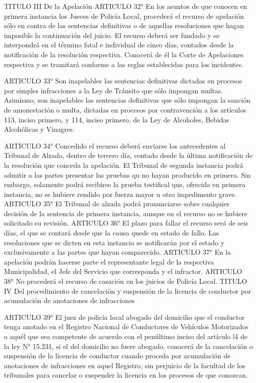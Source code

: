     TITULO III
    De la Apelación
    ARTICULO 32° En los asuntos de que conocen en primera instancia los Jueces de Policía Local, procederá el recurso de apelación sólo en contra de las sentencias definitivas o de aquellas resoluciones que hagan imposible la continuación del juicio. El recurso deberá ser fundado y se interpondrá en el término fatal e individual de cinco días, contados desde la notificación de la resolución respectiva.
    Conocerá de él la Corte de Apelaciones respectiva y se tramitará conforme a las reglas establecidas para los incidentes.
 



    ARTICULO 33° Son inapelables las sentencias definitivas dictadas en procesos por simples infracciones a la Ley de Tránsito que sólo impongan multas.
    Asimismo, son inapelables las sentencias definitivas que sólo impongan la sanción de amonestación o multa, dictadas en procesos por contravención a los artículos 113, inciso primero, y 114, inciso primero, de la Ley de Alcoholes, Bebidas Alcohólicas y Vinagres.

    ARTICULO 34° Concedido el recurso deberá enviarse los antecedentes al Tribunal de Alzada, dentro de tercero día, contado desde la última notificación de la resolución que conceda la apelación.
    El Tribunal de segunda instancia podrá admitir a las partes presentar las pruebas qu no hayan producido en primera. Sin embargo, solamente podrá recibirse la prueba testifical que, ofrecida en primera instancia, no se hubiere rendido por fuerza mayor u otro impedimento grave.
    ARTICULO 35° El Tribunal de alzada podrá pronunciarse sobre cualquier decisión de la sentencia de primera instancia, aunque en el recurso no se hubiere solicitado su revisión.
    ARTICULO 36° El plazo para fallar el recurso será de seis días, el que se contará desde que la causa quede en estado de fallo.
    Las resoluciones que se dicten en esta instancia se notificarán por el estado y exclusivamente a las partes que hayan comparecido.
    ARTICULO 37° En la apelación podrán hacerse parte el representante legal de la respectiva Municipalidad, el Jefe del Servicio que corresponda y el infractor.
    ARTICULO 38° No procederá el recurso de casación en los juicios de Policía Local.
    TITULO IV
    Del procedimiento de cancelación y suspensión de la licencia de conductor por acumulación de anotaciones de  infracciones



    ARTICULO 39° El juez de policía local abogado del domicilio que el conductor tenga anotado en el Registro Nacional de Conductores de Vehículos Motorizados o aquél que sea competente de acuerdo con el penúltimo inciso del artículo l4 de la ley N° 15.231, si el del domicilio no fuere abogado, conocerá de la cancelación o suspensión de la licencia de conductor cuando proceda por acumulación de anotaciones de infracciones en aquel Registro, sin perjuicio de la facultad de los tribunales para cancelar o suspender la licencia en los procesos de que conozcan.

